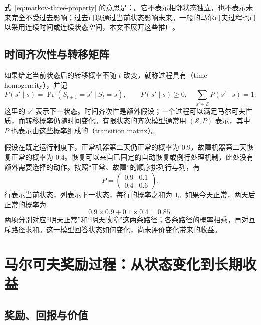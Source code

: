 \documentclass[UTF8]{ctexart}
\begin{document}
式~\eqref{eq:markov-three-property} 的意思是：。它不表示相邻状态独立，也不表示未来完全不受过去影响；过去可以通过当前状态影响未来。一般的马尔可夫过程也可以采用连续时间或连续状态空间，本文不展开这些推广。

\subsection{时间齐次性与转移矩阵}

如果给定当前状态后的转移概率不随 $t$ 改变，就称过程具有（time homogeneity），并记
\begin{equation}
  P(s'\mid s)=\Pr(S_{t+1}=s'\mid S_t=s),
  \qquad
  P(s'\mid s)\geq0,\quad
  \sum_{s'\in\mathcal S}P(s'\mid s)=1.
  \label{eq:markov-three-transition}
\end{equation}
这里的 $s'$ 表示下一状态。时间齐次性是额外假设；一个过程可以满足马尔可夫性质，而转移概率仍随时间变化。有限状态的齐次模型通常用 $(\mathcal S,P)$ 表示，其中 $P$ 也表示由这些概率组成的（transition matrix）。

\begin{example}[机器状态的随机演化]
\label{ex:markov-three-machine}
假设在既定运行制度下，正常机器第二天仍正常的概率为 $0.9$，故障机器第二天恢复正常的概率为 $0.4$。恢复可以来自已固定的自动恢复或例行处理机制，此处没有额外需要选择的动作。按照“正常、故障”的顺序排列行与列，有
\begin{equation}
  P=\begin{pmatrix}
    0.9&0.1\\
    0.4&0.6
  \end{pmatrix}.
  \label{eq:markov-three-machine-p}
\end{equation}
行表示当前状态，列表示下一状态，每行的概率之和为 $1$。如果今天正常，两天后正常的概率为
\[
  0.9\times0.9+0.1\times0.4=0.85.
\]
两项分别对应“明天正常”和“明天故障”这两条路径；各条路径的概率相乘，再对互斥路径求和。这一模型回答状态如何变化，尚未评价变化带来的收益。
\end{example}

\section{马尔可夫奖励过程：从状态变化到长期收益}
\label{sec:markov-three-mrp}

\subsection{奖励、回报与价值}
\end{document}
